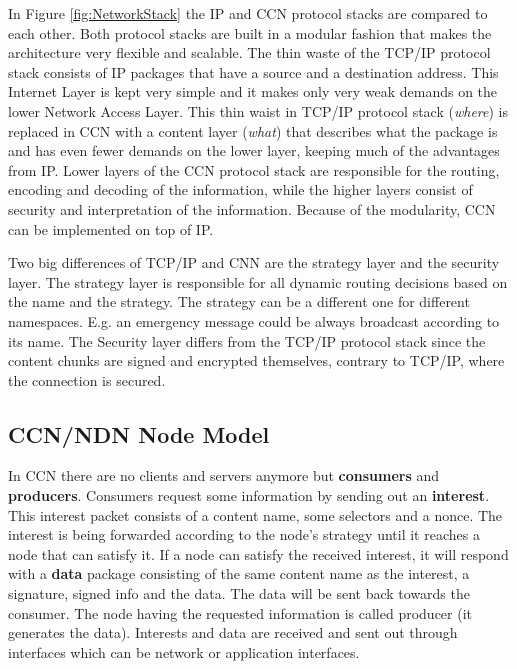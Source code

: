 \newpage

In Figure \ref{fig:NetworkStack} the IP and CCN protocol stacks are compared to each other. Both protocol stacks are built in a modular fashion that makes the architecture very flexible and scalable. The thin waste of the TCP/IP protocol stack consists of IP packages that have a source and a destination address. This Internet Layer is kept very simple and it makes only very weak demands on the lower Network Access Layer. This thin waist in TCP/IP protocol stack (\emph{where}) is replaced in CCN with a content layer (\emph{what}) that describes what the package is and has even fewer demands on the lower layer, keeping much of the advantages from IP. Lower layers of the CCN protocol stack are responsible for the routing, encoding and decoding of the information, while the higher layers consist of security and interpretation of the information. Because of the modularity, CCN can be implemented on top of IP.

\vspace{5mm} %

Two big differences of TCP/IP and CNN are the strategy layer and the security layer. The strategy layer is responsible for all dynamic routing decisions based on the name and the strategy. The strategy can be a different one for different namespaces. E.g. an emergency message could be always broadcast according to its name. The Security layer differs from the TCP/IP protocol stack since the content chunks are signed and encrypted themselves, contrary to TCP/IP, where the connection is secured.

\subsection{CCN/NDN Node Model}

In CCN there are no clients and servers anymore but \textbf{consumers} and \textbf{producers}. Consumers request some information by sending out an \textbf{interest}. This interest packet consists of a content name, some selectors and a nonce. The interest is being forwarded according to the node's strategy until it reaches a node that can satisfy it. If a node can satisfy the received interest, it will respond with a \textbf{data} package consisting of the same content name as the interest, a signature, signed info and the data. The data will be sent back towards the consumer. The node having the requested information is called producer (it generates the data). Interests and data are received and sent out through interfaces which can be network or application interfaces.

